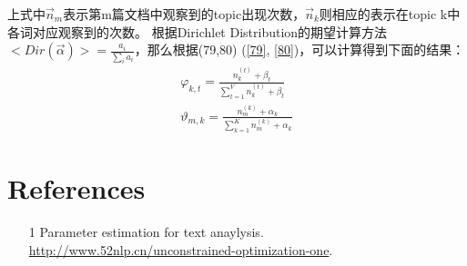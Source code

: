 \documentclass[UTF8]{ctexart}
\begin{document}
上式中$\vec{n}_m$表示第m篇文档中观察到的topic出现次数，$\vec{n}_k$则相应的表示在topic k中各词对应观察到的次数。
根据Dirichlet Distribution的期望计算方法$<Dir(\vec{\alpha})> = \frac{a_i}{\sum_i a_i}$，那么根据(79,80)
(\ref{79}, \ref{80})，可以计算得到下面的结果：
\begin{align}
\label{81}
\varphi_{k,t} = \frac{n_k^{(t)}+\beta_t}{\sum_{t=1}^V n_k^{(t)}+\beta_t}
\\
\label{82}
\vartheta_{m,k} = \frac{n_m^{(k)}+\alpha_k}{\sum_{k=1}^K n_m^{(k)}+\alpha_k}
\end{align}


\section{References}
\begin{itemize}
\item[1] Parameter estimation for text anaylysis.\\
\url{http://www.52nlp.cn/unconstrained-optimization-one}.
\end{itemize}
\end{document}
